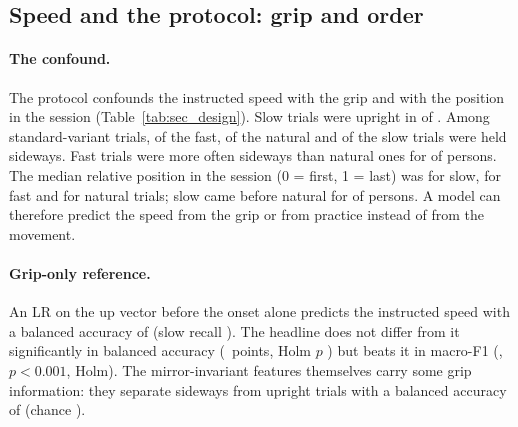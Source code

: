 
\FloatBarrier
\subsection{Speed and the protocol: grip and order}\label{app:sec:confounds}

\paragraph{The confound.} The protocol confounds the instructed speed with the grip and with the position in the
session (Table~\ref{tab:sec_design}). Slow trials were upright in  of .
Among standard-variant trials,  of the fast,  of the natural and
 of the slow trials were held sideways. Fast trials were more often sideways than natural
ones for  of  persons. The median relative position in the
session (0 = first, 1 = last) was  for slow,  for fast and
 for natural trials; slow came before natural for  of
 persons. A model can therefore predict the speed from the grip or from practice instead
of from the movement.

\paragraph{Grip-only reference.} An LR on the up vector before the onset alone predicts the instructed speed with a
balanced accuracy of  (slow recall ). The headline does not
differ from it significantly in balanced accuracy (~points,
Holm $p$ ) but beats it in macro-F1
(, $p < 0.001$, Holm). The mirror-invariant features themselves
carry some grip information: they separate sideways from upright trials with a balanced accuracy of
 (chance ).

